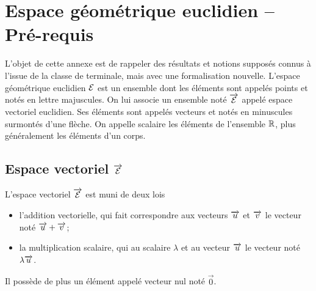 \chapter{Espace géométrique euclidien -- Pré-requis}

L'objet de cette annexe est de rappeler des résultats et notions supposés connus à l'issue de la classe de terminale, mais avec une formalisation nouvelle.
L'espace géométrique euclidien $\mathcal{E}$ est un ensemble dont les éléments sont appelés points et notés en lettre majuscules.
On lui associe un ensemble noté $\overrightarrow{\mathcal{E}}$ appelé espace vectoriel euclidien. Ses éléments sont appelés vecteurs et notés en minuscules surmontés d'une flèche.
On appelle scalaire les éléments de l'ensemble $\mathbb{R}$, plus généralement les éléments d'un corps.

\section{Espace vectoriel $\protect\overrightarrow{\mathcal{E}}$}

L'espace vectoriel $\overrightarrow{\mathcal{E}}$ est muni de deux lois
\begin{itemize}
\item l'addition vectorielle, qui fait correspondre aux vecteurs $\overrightarrow{u}$ et $\overrightarrow{v}$ le vecteur noté $\overrightarrow{u} + \overrightarrow{v}$;
\item la multiplication scalaire, qui au scalaire $\lambda$ et au vecteur $\overrightarrow{u}$ le vecteur noté $\lambda \overrightarrow{u}$.
\end{itemize}
 
Il possède de plus un élément appelé vecteur nul noté $\vec{0}$.

